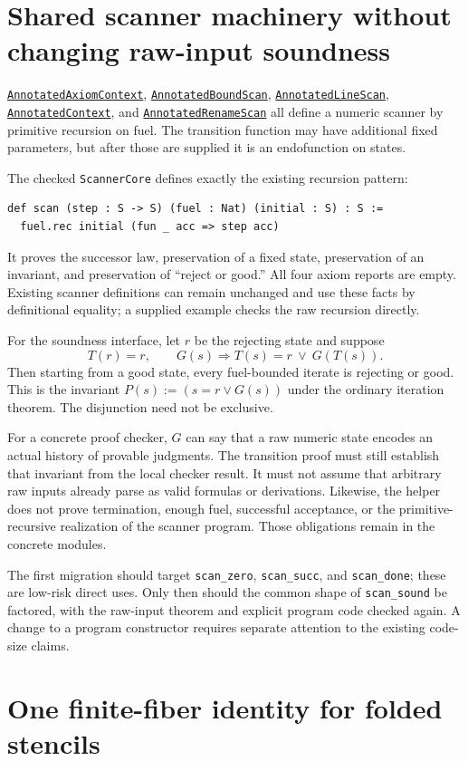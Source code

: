 \documentclass[11pt,letterpaper]{article}
\newcommand{\code}[1]{\nolinkurl{#1}}
\newcommand{\src}[1]{\href{https://github.com/VladimirReshetnikov/ProveIt/blob/60e9c5d620c6c387d932876cfa2d9376f64ea56c/Computability/DiophantineConsistency/Lean/DiophantineConsistency/#1.lean}{\texttt{#1}}}
\begin{document}
\section{Shared scanner machinery without changing raw-input soundness}

\src{AnnotatedAxiomContext}, \src{AnnotatedBoundScan},
\src{AnnotatedLineScan}, \src{AnnotatedContext}, and
\src{AnnotatedRenameScan} all define a numeric scanner by primitive recursion
on fuel. The transition function may have additional fixed parameters, but
after those are supplied it is an endofunction on states.

The checked \code{ScannerCore} defines exactly the existing recursion pattern:
\begin{lstlisting}
def scan (step : S -> S) (fuel : Nat) (initial : S) : S :=
  fuel.rec initial (fun _ acc => step acc)
\end{lstlisting}
It proves the successor law, preservation of a fixed state, preservation of an
invariant, and preservation of ``reject or good.'' All four axiom reports are
empty. Existing scanner definitions can remain unchanged and use these facts
by definitional equality; a supplied example checks the raw recursion directly.

For the soundness interface, let $r$ be the rejecting state and suppose
\[
 T(r)=r,\qquad G(s)\Longrightarrow T(s)=r\ \lor\ G(T(s)).
\]
Then starting from a good state, every fuel-bounded iterate is rejecting or
good. This is the invariant $P(s):=(s=r\lor G(s))$ under the ordinary iteration
theorem. The disjunction need not be exclusive.

For a concrete proof checker, $G$ can say that a raw numeric state encodes an
actual history of provable judgments. The transition proof must still establish
that invariant from the local checker result. It must not assume that arbitrary
raw inputs already parse as valid formulas or derivations. Likewise, the helper
does not prove termination, enough fuel, successful acceptance, or the
primitive-recursive realization of the scanner program. Those obligations
remain in the concrete modules.

The first migration should target \code{scan_zero}, \code{scan_succ}, and
\code{scan_done}; these are low-risk direct uses. Only then should the common
shape of \code{scan_sound} be factored, with the raw-input theorem and explicit
program code checked again. A change to a program constructor requires separate
attention to the existing code-size claims.

\section{One finite-fiber identity for folded stencils}
\end{document}
